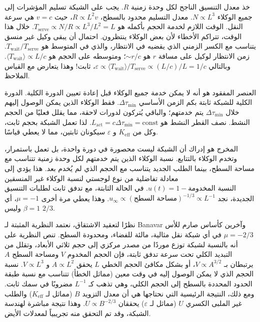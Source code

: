 \documentclass[11pt,a4paper]{article}
\begin{document}
	خذ معدل التنسيق الناجح لكل وحدة زمنية \(R\). يجب على الشبكة تسليم المؤشرات إلى جميع الوكلاء \(N \propto L^3\). معدل التسليم محدود بالسطح، \(R \propto L^2 v\)، حيث \(v = c\) هي سرعة النقل. الوقت اللازم لخدمة الحجم بأكمله هو \(T_{\mathrm{serve}} \propto N/R \propto L^3/L^2 = L\). خلال هذا الوقت، تتراكم الأخطاء لأن بعض الوكلاء ينتظرون. احتمال أن يبقى وكيل غير منسق يتناسب مع الكسر الزمني الذي يقضيه في الانتظار، والذي في المتوسط هو \(T_{\mathrm{wait}}/T_{\mathrm{serve}}\). زمن الانتظار لوكيل على مسافة \(r\) هو \(\sim r/c\)؛ ومتوسطه على الحجم هو \(\langle T_{\mathrm{wait}} \rangle \propto L/c\). وبالتالي \(\varepsilon \propto \langle T_{\mathrm{wait}} \rangle/T_{\mathrm{serve}} \propto (L/c)/L = 1/c\)، ثابت! وهذا يتعارض مع القياس الملاحظ.
	
	العنصر المفقود هو أنه لا يمكن خدمة جميع الوكلاء قبل إعادة تعيين الدورة الكلية. الدورة الكلية للشبكة ثابتة بكم الزمن الأساسي \(\Delta\tau_{\min}\). فقط الوكلاء الذين يمكن الوصول إليهم خلال \(\Delta\tau_{\min}\) يتم خدمتهم؛ والباقي يُتركون لدورات لاحقة، مما يقلل فعليًا من الحجم النشط. نصف القطر النشط هو \(L_{\mathrm{act}} = c\Delta\tau_{\min} = \text{const}\). لذا تعمل الشبكة بحجم ثابت، وكل من \(K_{\mathrm{eff}}\) و \(\varepsilon\) سيكونان ثابتين، مما لا يعطي قياسًا.
	
	المخرج هو إدراك أن الشبكة ليست محصورة في دورة واحدة، بل تعمل باستمرار، وتخدم الوكلاء بالتتابع. نسبة الوكلاء الذين يتم خدمتهم لكل وحدة زمنية تتناسب مع مساحة السطح، بينما الطلب الجديد يتناسب مع الحجم الذي لم يُخدم بعد. هذا يؤدي إلى معادلة تفاضلية من نوع لوجستي لنسبة الوكلاء غير المنسقين \(u(t) = 1 - \text{النسبة المخدومة}\). في الحالة الثابتة، مع تدفق ثابت لطلبات التنسيق الجديدة، نجد \(u_{\infty} \propto (\text{مساحة السطح})^{-1/3} \propto L^{-1}\). وهذا يعطي مرة أخرى \(\mu = -1\)، أي \(\beta = 1\) وليس \(2/3\).
	
	نظرًا لتعقيد الاشتقاق، نعتمد النظرية المثبتة لـ Banavar وآخرين كأساس صارم للأس \(\mu = -2/3\) في أي شبكة نقل مثالية، مالئة للفضاء، ومحدودة السطح. تنص النظرية على أنه بالنسبة لشبكة توزع موردًا من مصدر مركزي إلى حجم ثلاثي الأبعاد، وتقلل من التبديد الكلي تحت سرعة تدفق ثابتة، فإن الحجم المخدوم \(V\) ومساحة السطح \(A\) يرتبطان بـ \(V \propto A^{3/2}\)، أو بشكل مكافئ الحجم الخطي \(L\) يحقق \(A \propto L^2\) و \(V \propto L^3\). نسبة الحجم الذي لا يمكن الوصول إليه في وقت معين (مماثل الخطأ) تتناسب مع نسبة طبقة الحدود المحددة بالسطح إلى الحجم الكلي، وهي تذهب كـ \(L^{-1}\) مضروبًا في سمك ثابت. ومع ذلك، النتيجة الرئيسية التي نحتاجها هي أن معدل التزويد \(B\) (مماثل لـ \(K_{\mathrm{eff}}\)) والطلب غير الملبى الكسري \(U\) (مماثل لـ \(\varepsilon\)) يحققان \(U \propto B^{-2/3}\). وهذا نتيجة مباشرة لهندسة الشبكة، وقد تم التحقق منه تجريبياً لمعدلات الأيض.
	
\end{document}

